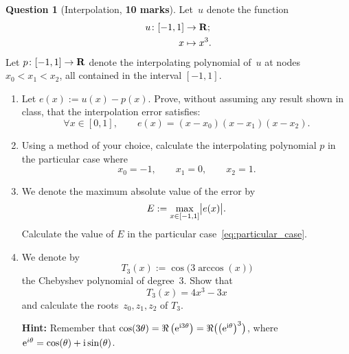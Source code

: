 \documentclass[11pt]{article}
\theoremstyle{definition}
\newtheorem{question}{Question}
\theoremstyle{remark}
\theoremstyle{plain}%
\begin{document}
\newpage
\begin{question}
    [Interpolation, \textbf{10 marks}]
    Let~$u$ denote the function
    \begin{align*}
        u\colon
        [-1, 1] &\to \mathbf R; \\
        x &\mapsto x^3.
    \end{align*}
    Let $p \colon [-1, 1] \to \mathbf R$ denote the interpolating polynomial of~$u$ at nodes $x_0 < x_1 < x_2$,
    all contained in the interval $[-1, 1]$.
    \begin{enumerate}
        \itemsep0pt
        \item
            Let $e(x) := u(x) - p(x)$.
            Prove, without assuming any result shown in class,
            that the interpolation error satisfies:
            \[
                \forall x \in [0, 1], \qquad
                e(x) = (x-x_0) (x-x_1) (x-x_2).
            \]

        \item
            Using a method of your choice,
            calculate the interpolating polynomial $p$ in the particular case where
            \begin{equation}
                \label{eq:particular_case}
                x_0 = -1, \qquad x_1 = 0, \qquad x_2 = 1.
            \end{equation}

        \item {}
            We denote the maximum absolute value of the error by
            \begin{equation}
                \label{eq:max_error}
                E := \max_{x \in [-1, 1]} \abs[\big]{e(x)}.
            \end{equation}
            Calculate the value of $E$ in the particular case~\eqref{eq:particular_case}.

        \item
            We denote by
            \[
                T_3(x) := \cos\bigl(3 \arccos(x)\bigr)
            \]
            the Chebyshev polynomial of degree~3.
            Show that
            \[
                T_3(x) = 4x^3 - 3x
            \]
            and calculate the roots~$z_0, z_1, z_2$ of $T_3$.

            \textbf{Hint:} Remember that $\cos (3 \theta) = \Re \left( \mathrm e^{\mathrm i 3\theta} \right) = \Re \bigl( \left(\mathrm e^{\mathrm i \theta} \right)^3 \bigr)$, where $\mathrm e^{i \theta} = \cos (\theta) + \mathrm i \sin (\theta)$.


\end{enumerate}
\end{question}
\end{document}
